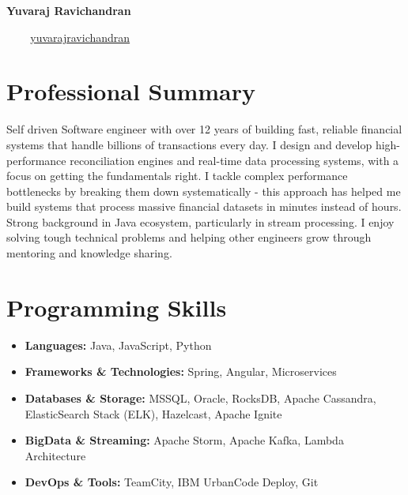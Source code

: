 \documentclass[11pt, a4paper]{article}
\newcommand{\resumeSubHeadingListStart}{\begin{itemize}[leftmargin=*]}
\newcommand{\resumeSubHeadingListEnd}{\end{itemize}}
\newcommand{\contactInfo}[3]{
    \centerline{
        \faEnvelope\ #1 \textbar{} 
        \faPhone\ #2 \textbar{}
        \faLinkedin\ #3
    }
    \vspace{1em}
}
\newcommand{\summary}[1]{
    {\par\small\setlength{\parindent}{0pt}#1\par}
}
\begin{document}
\begin{center}
  {\Huge\bfseries Yuvaraj Ravichandran}
\end{center}

\contactInfo{\href{mailto:\email}{\email}}{\mobile}{\href{https://www.linkedin.com/in/yuvarajravichandran}{yuvarajravichandran}}

\section{Professional Summary}
\summary{Self driven Software engineer with over 12 years of building fast, reliable financial systems that handle billions of transactions every day. I design and develop high-performance reconciliation engines and real-time data processing systems, with a focus on getting the fundamentals right. I tackle complex performance bottlenecks by breaking them down systematically - this approach has helped me build systems that process massive financial datasets in minutes instead of hours. Strong background in Java ecosystem, particularly in stream processing. I enjoy solving tough technical problems and helping other engineers grow through mentoring and knowledge sharing.}

\section{Programming Skills}
  \resumeSubHeadingListStart
    \item{
      \textbf{Languages:} Java, JavaScript, Python
    }
    \item{
      \textbf{Frameworks \& Technologies:} Spring, Angular, Microservices
    }
    \item{
      \textbf{Databases \& Storage:} MSSQL, Oracle, RocksDB, Apache Cassandra, ElasticSearch Stack (ELK), Hazelcast, Apache Ignite
    }
    \item{
      \textbf{BigData \& Streaming:} Apache Storm, Apache Kafka, Lambda Architecture
    }
    \item{
      \textbf{DevOps \& Tools:} TeamCity, IBM UrbanCode Deploy, Git
    }
 \resumeSubHeadingListEnd

\end{document}
